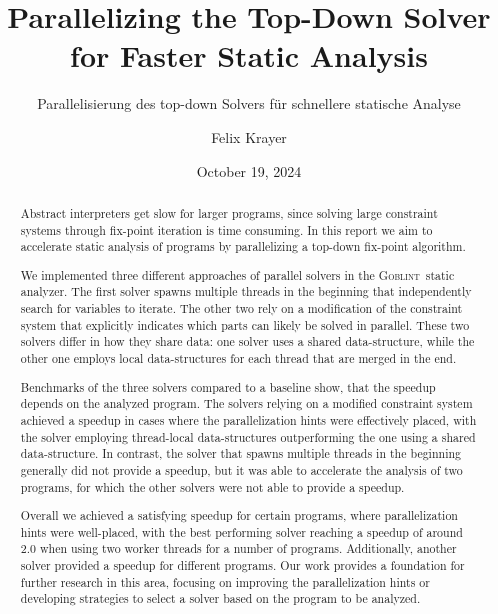 \documentclass[
  english,        %
  font=times,     %
  twocolumn,      %
]{tumarticle}
\title{Parallelizing the Top-Down Solver for Faster Static Analysis}
\subtitle{Parallelisierung des top-down Solvers für schnellere statische Analyse}
\author[affil=1, email=felix.krayer@tum.de]{Felix Krayer}
\affil[mark=1]{\theUniversityName}
\date{October 19, 2024}
\newcommand{\gob} {\textsc{Goblint}}
\begin{document}
\maketitle



\begin{abstract}
  Abstract interpreters get slow for larger programs, since solving large constraint systems through fix-point iteration is time consuming. In this report we aim to accelerate static analysis of programs by parallelizing a top-down fix-point algorithm.

  We implemented three different approaches of parallel solvers in the \gob\ static analyzer. The first solver spawns multiple threads in the beginning that independently search for variables to iterate. The other two rely on a modification of the constraint system that explicitly indicates which parts can likely be solved in parallel. These two solvers differ in how they share data: one solver uses a shared data-structure, while the other one employs local data-structures for each thread that are merged in the end.

  Benchmarks of the three solvers compared to a baseline show, that the speedup depends on the analyzed program. The solvers relying on a modified constraint system achieved a speedup in cases where the parallelization hints were effectively placed, with the solver employing thread-local data-structures outperforming the one using a shared data-structure. In contrast, the solver that spawns multiple threads in the beginning generally did not provide a speedup, but it was able to accelerate the analysis of two programs, for which the other solvers were not able to provide a speedup. 

  Overall we achieved a satisfying speedup for certain programs, where parallelization hints were well-placed, with the best performing solver reaching a speedup of around 2.0 when using two worker threads for a number of programs. Additionally, another solver provided a speedup for different programs. Our work provides a foundation for further research in this area, focusing on improving the parallelization hints or developing strategies to select a solver based on the program to be analyzed.
\end{abstract}








\end{document}
